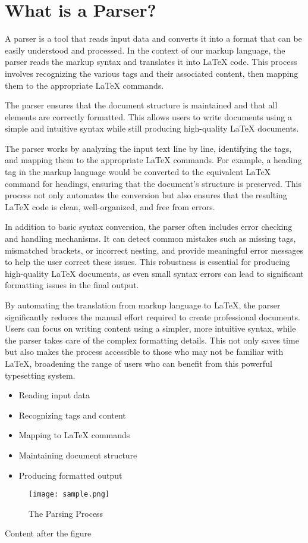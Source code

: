 \documentclass[oneside]{book}
\begin{document}
\section{What is a Parser?}
A parser is a tool that reads input data and converts it into a format that can be easily understood and processed. In the context of our markup language, the parser reads the markup syntax and translates it into LaTeX code. This process involves recognizing the various tags and their associated content, then mapping them to the appropriate LaTeX commands.\par
The parser ensures that the document structure is maintained and that all elements are correctly formatted. This allows users to write documents using a simple and intuitive syntax while still producing high-quality LaTeX documents.\par
The parser works by analyzing the input text line by line, identifying the tags, and mapping them to the appropriate LaTeX commands. For example, a heading tag in the markup language would be converted to the equivalent LaTeX command for headings, ensuring that the document's structure is preserved. This process not only automates the conversion but also ensures that the resulting LaTeX code is clean, well-organized, and free from errors.\par
In addition to basic syntax conversion, the parser often includes error checking and handling mechanisms. It can detect common mistakes such as missing tags, mismatched brackets, or incorrect nesting, and provide meaningful error messages to help the user correct these issues. This robustness is essential for producing high-quality LaTeX documents, as even small syntax errors can lead to significant formatting issues in the final output.\par
By automating the translation from markup language to LaTeX, the parser significantly reduces the manual effort required to create professional documents. Users can focus on writing content using a simpler, more intuitive syntax, while the parser takes care of the complex formatting details. This not only saves time but also makes the process accessible to those who may not be familiar with LaTeX, broadening the range of users who can benefit from this powerful typesetting system.\par
\begin{itemize}
\item Reading input data
\item Recognizing tags and content
\item Mapping to LaTeX commands
\item Maintaining document structure
\item Producing formatted output
\end{itemize}
\begin{figure}[h]
\centering
\texttt{[image: sample.png]}
\caption{The Parsing Process}
\end{figure}Content after the figure\par
\end{document}
